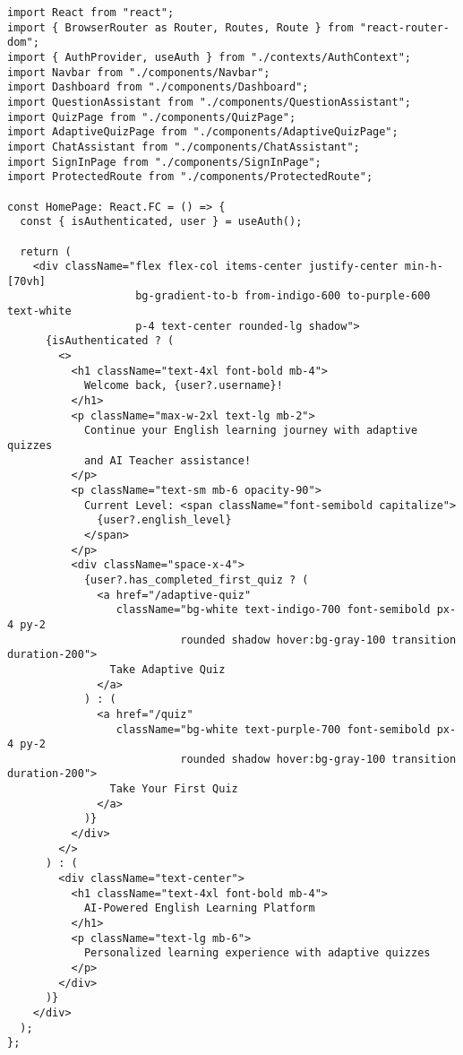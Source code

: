 \documentclass[12pt,a4paper]{article}
\begin{document}
\begin{lstlisting}[style=javascriptstyle, caption=Componente App React - Architettura Frontend, label=lst:reactapp]
import React from "react";
import { BrowserRouter as Router, Routes, Route } from "react-router-dom";
import { AuthProvider, useAuth } from "./contexts/AuthContext";
import Navbar from "./components/Navbar";
import Dashboard from "./components/Dashboard";
import QuestionAssistant from "./components/QuestionAssistant";
import QuizPage from "./components/QuizPage";
import AdaptiveQuizPage from "./components/AdaptiveQuizPage";
import ChatAssistant from "./components/ChatAssistant";
import SignInPage from "./components/SignInPage";
import ProtectedRoute from "./components/ProtectedRoute";

const HomePage: React.FC = () => {
  const { isAuthenticated, user } = useAuth();

  return (
    <div className="flex flex-col items-center justify-center min-h-[70vh] 
                    bg-gradient-to-b from-indigo-600 to-purple-600 text-white 
                    p-4 text-center rounded-lg shadow">
      {isAuthenticated ? (
        <>
          <h1 className="text-4xl font-bold mb-4">
            Welcome back, {user?.username}!
          </h1>
          <p className="max-w-2xl text-lg mb-2">
            Continue your English learning journey with adaptive quizzes 
            and AI Teacher assistance!
          </p>
          <p className="text-sm mb-6 opacity-90">
            Current Level: <span className="font-semibold capitalize">
              {user?.english_level}
            </span>
          </p>
          <div className="space-x-4">
            {user?.has_completed_first_quiz ? (
              <a href="/adaptive-quiz" 
                 className="bg-white text-indigo-700 font-semibold px-4 py-2 
                           rounded shadow hover:bg-gray-100 transition duration-200">
                Take Adaptive Quiz
              </a>
            ) : (
              <a href="/quiz" 
                 className="bg-white text-purple-700 font-semibold px-4 py-2 
                           rounded shadow hover:bg-gray-100 transition duration-200">
                Take Your First Quiz
              </a>
            )}
          </div>
        </>
      ) : (
        <div className="text-center">
          <h1 className="text-4xl font-bold mb-4">
            AI-Powered English Learning Platform
          </h1>
          <p className="text-lg mb-6">
            Personalized learning experience with adaptive quizzes
          </p>
        </div>
      )}
    </div>
  );
};
\end{lstlisting}
\end{document}

